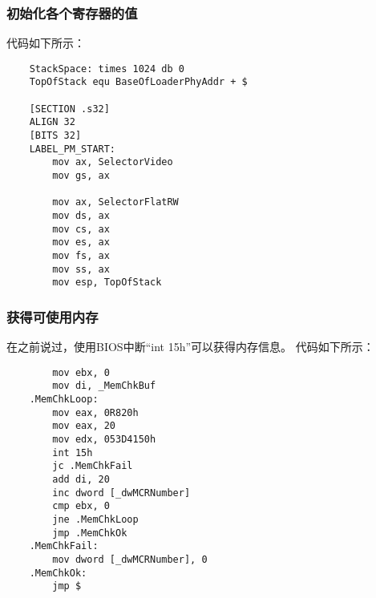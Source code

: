 \documentclass[a4paper,left=2.5cm,right=2.5cm,11pt]{article}
\begin{document}
\subsubsection{初始化各个寄存器的值}
	代码如下所示：
	\begin{lstlisting}
	StackSpace: times 1024 db 0
	TopOfStack equ BaseOfLoaderPhyAddr + $

	[SECTION .s32]
	ALIGN 32
	[BITS 32]
	LABEL_PM_START:
		mov ax, SelectorVideo
		mov gs, ax

		mov ax, SelectorFlatRW
		mov ds, ax
		mov cs, ax
		mov es, ax
		mov fs, ax
		mov ss, ax
		mov esp, TopOfStack
	\end{lstlisting}

\subsubsection{获得可使用内存}
	在之前说过，使用BIOS中断“int 15h”可以获得内存信息。
	代码如下所示：
	\begin{lstlisting}
		mov ebx, 0
		mov di, _MemChkBuf
	.MemChkLoop:
		mov eax, 0R820h
		mov eax, 20
		mov edx, 053D4150h
		int 15h
		jc .MemChkFail
		add di, 20
		inc dword [_dwMCRNumber]
		cmp ebx, 0
		jne .MemChkLoop
		jmp .MemChkOk
	.MemChkFail:
		mov dword [_dwMCRNumber], 0
	.MemChkOk:
		jmp $
	\end{lstlisting}
\end{document}
